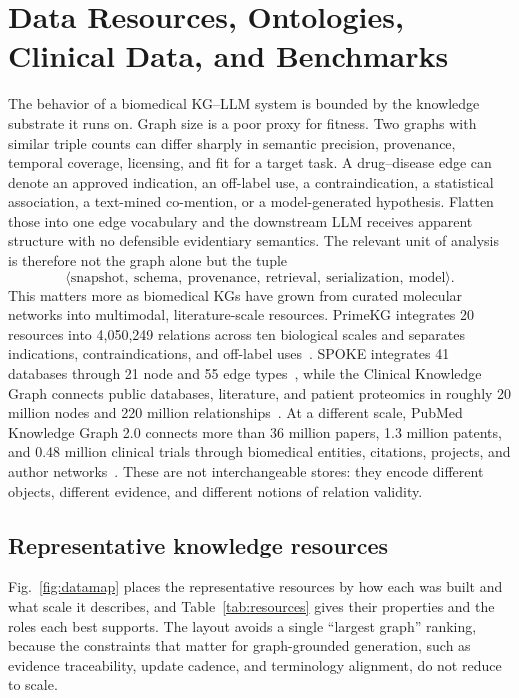\section{Data Resources, Ontologies, Clinical Data, and Benchmarks}
\label{sec:resources}

The behavior of a biomedical KG--LLM system is bounded by the knowledge substrate it runs on. Graph size is a poor proxy for fitness. Two graphs with similar triple counts can differ sharply in semantic precision, provenance, temporal coverage, licensing, and fit for a target task. A drug--disease edge can denote an approved indication, an off-label use, a contraindication, a statistical association, a text-mined co-mention, or a model-generated hypothesis. Flatten those into one edge vocabulary and the downstream LLM receives apparent structure with no defensible evidentiary semantics. The relevant unit of analysis is therefore not the graph alone but the tuple
\begin{equation}
\langle \text{snapshot},\ \text{schema},\ \text{provenance},\ \text{retrieval},\ \text{serialization},\ \text{model} \rangle .
\end{equation}
This matters more as biomedical KGs have grown from curated molecular networks into multimodal, literature-scale resources. PrimeKG integrates 20 resources into 4{,}050{,}249 relations across ten biological scales and separates indications, contraindications, and off-label uses~\cite{chandak2023primekg}. SPOKE integrates 41 databases through 21 node and 55 edge types~\cite{morris2023spoke}, while the Clinical Knowledge Graph connects public databases, literature, and patient proteomics in roughly 20 million nodes and 220 million relationships~\cite{santos2022ckg}. At a different scale, PubMed Knowledge Graph 2.0 connects more than 36 million papers, 1.3 million patents, and 0.48 million clinical trials through biomedical entities, citations, projects, and author networks~\cite{xu2025pubmedkg}. These are not interchangeable stores: they encode different objects, different evidence, and different notions of relation validity.

\subsection{Representative knowledge resources}

Fig.~\ref{fig:datamap} places the representative resources by how each was built and what scale it describes, and Table~\ref{tab:resources} gives their properties and the roles each best supports. The layout avoids a single ``largest graph'' ranking, because the constraints that matter for graph-grounded generation, such as evidence traceability, update cadence, and terminology alignment, do not reduce to scale.

